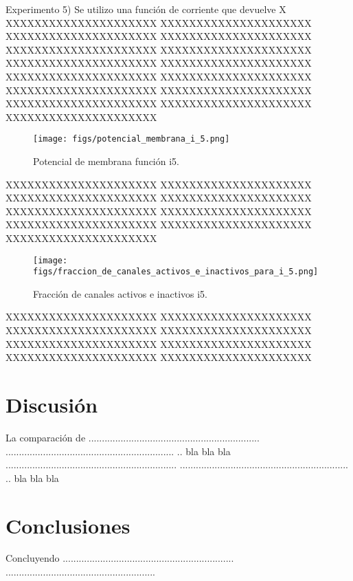 \documentclass[aps,prl,twocolumn,groupedaddress]{revtex4-2}
\begin{document}
Experimento 5) Se utilizo una función de corriente que devuelve X
XXXXXXXXXXXXXXXXXXXXX
XXXXXXXXXXXXXXXXXXXXX
XXXXXXXXXXXXXXXXXXXXX
XXXXXXXXXXXXXXXXXXXXX
XXXXXXXXXXXXXXXXXXXXX
XXXXXXXXXXXXXXXXXXXXX
XXXXXXXXXXXXXXXXXXXXX
XXXXXXXXXXXXXXXXXXXXX
XXXXXXXXXXXXXXXXXXXXX
XXXXXXXXXXXXXXXXXXXXX
XXXXXXXXXXXXXXXXXXXXX
XXXXXXXXXXXXXXXXXXXXX
XXXXXXXXXXXXXXXXXXXXX
XXXXXXXXXXXXXXXXXXXXX
XXXXXXXXXXXXXXXXXXXXX



\begin{figure}[h!]
\centering
\texttt{[image: figs/potencial\_membrana\_i\_5.png]}
\caption{Potencial de membrana función i5. \label{fig9}}
\end{figure}


XXXXXXXXXXXXXXXXXXXXX
XXXXXXXXXXXXXXXXXXXXX
XXXXXXXXXXXXXXXXXXXXX
XXXXXXXXXXXXXXXXXXXXX
XXXXXXXXXXXXXXXXXXXXX
XXXXXXXXXXXXXXXXXXXXX
XXXXXXXXXXXXXXXXXXXXX
XXXXXXXXXXXXXXXXXXXXX
XXXXXXXXXXXXXXXXXXXXX

\begin{figure}[h!]
\centering
\texttt{[image: figs/fraccion\_de\_canales\_activos\_e\_inactivos\_para\_i\_5.png]}
\caption{Fracción de canales activos e inactivos i5. \label{fig10}}
\end{figure}

XXXXXXXXXXXXXXXXXXXXX
XXXXXXXXXXXXXXXXXXXXX
XXXXXXXXXXXXXXXXXXXXX
XXXXXXXXXXXXXXXXXXXXX
XXXXXXXXXXXXXXXXXXXXX
XXXXXXXXXXXXXXXXXXXXX
XXXXXXXXXXXXXXXXXXXXX
XXXXXXXXXXXXXXXXXXXXX



\section{Discusión}

La comparación de ................................................................
...............................................................
.. bla bla bla ................................................................
...............................................................
.. bla bla bla

\section{Conclusiones}

Concluyendo ................................................................
........................................................
\end{document}
